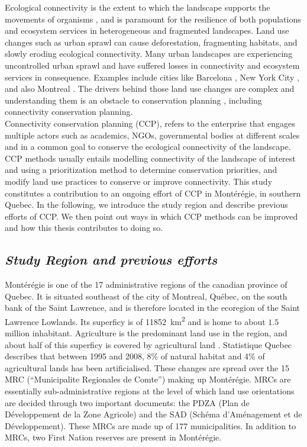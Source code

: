 \documentclass[12pt,Bold,TexShade]{thesis/mcgilletdclass}
\begin{document}
{Ecological connectivity is the extent to which the landscape supports the movements of organisms \citep{gonzalez_spatial_2017}, and is paramount for the resilience of both populations and ecosystem services \citep{mitchell_monteregie_2015} in heterogeneous and fragmented landscapes. Land use changes such as urban sprawl can cause deforestation, fragmenting habitats, and slowly eroding ecological connectivity. Many urban landscapes are experiencing uncontrolled urban sprawl and have suffered losses in connectivity and ecosystem services in consequence. Examples include cities like Barcelona \citep{marulli_gis_2005}, New York City \citep{mcphearson_urban_2014}, and also Montreal \citep{dupras_urban_2015}.  The drivers behind those land use changes are complex and understanding them is an obstacle to conservation planning  \citep{worboys_connectivity_2010}, including connectivity conservation planning. \\
Connectivity conservation planning (CCP), refers to the enterprise that engages multiple actors such as academics, NGOs, governmental bodies at different scales and in a common goal to conserve the ecological connectivity of the landscape. CCP methods usually entails modelling connectivity of the landscape of interest and using a prioritization method to determine conservation priorities, and modify land use practices to conserve or improve connectivity. This study constitutes a contribution to an ongoing effort of CCP in Montérégie, in southern Quebec. In the following, we introduce the study region and describe previous efforts of CCP. We then point out ways in which CCP methods can be improved and how this thesis contributes to doing so. \\ \vspace{2em}

\subsection*{\textit{Study Region and previous efforts \\ \vspace{1em}}}

Montérégie is one of the 17 administrative regions of the canadian province of Quebec. It is situated southeast of the city of Montreal, Québec, on the south bank of the Saint Lawrence, and is therefore located in the ecoregion of the Saint Lawrence Lowlands. Its superficy is of \SI{11852}{\km\squared} and is home to about $1.5$ million inhabitant. Agriculture is the predominant land use in the region, and about half of this superficy is covered by agricultural land \citep{isq_quebec_2020}. Statistique Quebec describes that between 1995 and 2008, 8\% of natural habitat and 4\% of agricultural lands has been artificialised. These changes are spread over the 15 MRC (“Municipalite Regionales de Comte”) making up Montérégie. MRCs are essentially sub-administrative regions at the level of which land use orientations are decided through two important documents: the PDZA (Plan de Développement de la Zone Agricole) and the SAD (Schéma d'Aménagement et de Développement). These MRCs are made up of 177 municipalities. In addition to MRCs, two First Nation reserves are present in Montérégie. \\

}
\end{document}
